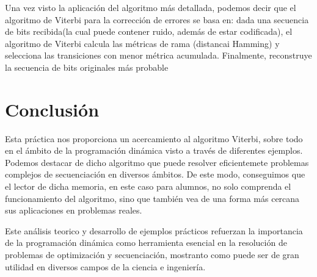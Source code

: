 \documentclass[11pt,openany]{book}
\begin{document}
Una vez visto la aplicación del algoritmo más detallada, podemos decir que el algoritmo de Viterbi para la corrección de errores
se basa en: dada una secuencia de bits recibida(la cual puede contener ruido, además de estar codificada), el algoritmo de Viterbi 
calcula las métricas de rama (distancai Hamming) y selecciona las transiciones con menor métrica acumulada. Finalmente, reconstruye
la secuencia de bits originales más probable


\chapter{Conclusión}
Esta práctica nos proporciona un acercamiento al algoritmo Viterbi, sobre todo en el ámbito de la programación dinámica visto a través
de diferentes ejemplos. Podemos destacar de dicho algoritmo que puede resolver eficientemete problemas complejos de secuenciación en 
diversos ámbitos. De este modo, conseguimos que el lector de dicha memoria, en este caso para alumnos, no solo comprenda el funcionamiento del algoritmo,
sino que también vea de una forma más cercana sus aplicaciones en problemas reales.

Este análisis teorico y desarrollo de ejemplos prácticos refuerzan la importancia de la programación dinámica
como herramienta esencial en la resolución de problemas de optimización y secuenciación, mostranto como puede 
ser de gran utilidad en diversos campos de la ciencia e ingeniería.
\end{document}
